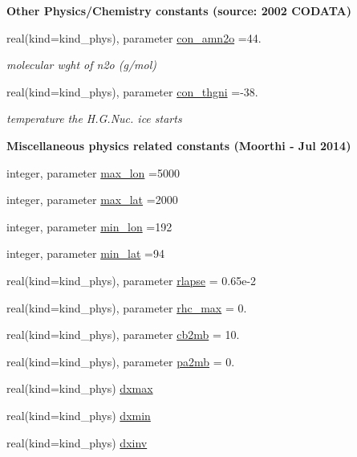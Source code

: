 \begin{Indent}{\bf Other Physics/\+Chemistry constants (source\+: 2002 C\+O\+D\+A\+TA)}
\begin{DoxyCompactItemize}
real(kind=kind\+\_\+phys), parameter \hyperlink{namespacephyscons_abb34f0d5a19aef4a975fb5b1e3141a7b}{con\+\_\+amn2o} =44.
\begin{DoxyCompactList}\small\item\em molecular wght of n2o (g/mol) \end{DoxyCompactList}\item 
real(kind=kind\+\_\+phys), parameter \hyperlink{namespacephyscons_a4d194dd8f216004f2f7b9e4521c2fe2c}{con\+\_\+thgni} =-\/38.
\begin{DoxyCompactList}\small\item\em temperature the H.\+G.\+Nuc. ice starts \end{DoxyCompactList}\end{DoxyCompactItemize}
\end{Indent}
\begin{Indent}{\bf Miscellaneous physics related constants (Moorthi -\/ Jul 2014)}\par
\begin{DoxyCompactItemize}
\item 
integer, parameter \hyperlink{namespacephyscons_afd0d42b08acf830fce089278841f35d8}{max\+\_\+lon} =5000
\item 
integer, parameter \hyperlink{namespacephyscons_a954d523a6dc3fe558de54a03b584e512}{max\+\_\+lat} =2000
\item 
integer, parameter \hyperlink{namespacephyscons_a058332a27ea45c1188760483078d6472}{min\+\_\+lon} =192
\item 
integer, parameter \hyperlink{namespacephyscons_a2bd1eff655c04ff37fa9dc10d3f2bb94}{min\+\_\+lat} =94
\item 
real(kind=kind\+\_\+phys), parameter \hyperlink{namespacephyscons_a40e396eb1da77e57801ab4d6521aa9d3}{rlapse} = 0.\+65e-\/2
\item 
real(kind=kind\+\_\+phys), parameter \hyperlink{namespacephyscons_abd762e7e22635a2f3d25e58b6bcde1fb}{rhc\+\_\+max} = 0.
\item 
real(kind=kind\+\_\+phys), parameter \hyperlink{namespacephyscons_afee4867dffc4da15248cff2e4ef39992}{cb2mb} = 10.
\item 
real(kind=kind\+\_\+phys), parameter \hyperlink{namespacephyscons_a6da0ad02b40738e185d46ba92f47434e}{pa2mb} = 0.
\item 
real(kind=kind\+\_\+phys) \hyperlink{namespacephyscons_a58cc4eb8ab140d1d56e8e1f2cad4aa93}{dxmax}
\item 
real(kind=kind\+\_\+phys) \hyperlink{namespacephyscons_a0d975826ce89583acdad7f32e028d979}{dxmin}
\item 
real(kind=kind\+\_\+phys) \hyperlink{namespacephyscons_ab94b4700f51149d28ed380c687f36c49}{dxinv}
\end{DoxyCompactItemize}
\end{Indent}


